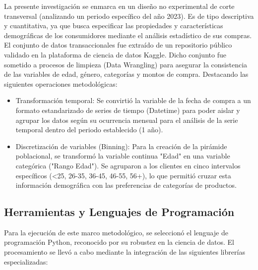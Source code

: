 \documentclass[oneside,11pt]{Latex/Classes/PhDthesisPSnPDF}
\begin{document}
La presente investigación se enmarca en un diseño no experimental de
corte transversal (analizando un periodo específico del año 2023). Es de
tipo descriptiva y cuantitativa, ya que busca especificar las
propiedades y características demográficas de los consumidores mediante
el análisis estadístico de sus compras. El conjunto de datos
transaccionales fue extraído de un repositorio público validado en la
plataforma de ciencia de datos Kaggle. Dicho conjunto fue sometido a
procesos de limpieza (Data Wrangling) para asegurar la consistencia de
las variables de edad, género, categorías y montos de compra. Destacando
las siguientes operaciones metodológicas:

\begin{itemize}
\item{Transformación temporal: Se convirtió la variable de la fecha de compra a un formato estandarizado de series de tiempo (Datetime) para poder aislar y agrupar los datos según su ocurrencia mensual para el análisis de la serie temporal dentro del periodo establecido (1 año).}

\item{Discretización de variables (Binning): Para la creación de la pirámide poblacional, se transformó la variable continua "Edad" en una variable categórica ("Rango Edad"). Se agruparon a los clientes en cinco intervalos específicos (<25, 26-35, 36-45, 46-55, 56+), lo que permitió cruzar esta información demográfica con las preferencias de categorías de productos.}
\end{itemize}

\subsection{Herramientas y Lenguajes de Programación}

Para la ejecución de este marco metodológico, se seleccionó el lenguaje
de programación Python, reconocido por su robustez en la ciencia de
datos. El procesamiento se llevó a cabo mediante la integración de las
siguientes librerías especializadas:
\end{document}
